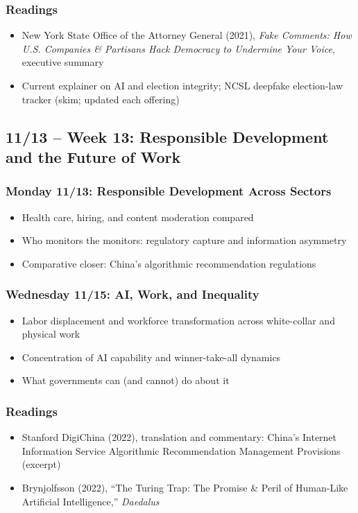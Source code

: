 \documentclass[12pt]{article}
\begin{document}
    \subsubsection*{Readings}
        \begin{itemize}
            \item New York State Office of the Attorney General (2021), \emph{Fake Comments: How U.S. Companies \& Partisans Hack Democracy to Undermine Your Voice}, executive summary
            \item Current explainer on AI and election integrity; NCSL deepfake election-law tracker (skim; updated each offering)
        \end{itemize}

\subsection*{11/13 -- Week 13: Responsible Development and the Future of Work}
    \subsubsection*{Monday 11/13: Responsible Development Across Sectors}
        \begin{itemize}
            \item Health care, hiring, and content moderation compared
            \item Who monitors the monitors: regulatory capture and information asymmetry
            \item Comparative closer: China's algorithmic recommendation regulations
        \end{itemize}
    \subsubsection*{Wednesday 11/15: AI, Work, and Inequality}
        \begin{itemize}
            \item Labor displacement and workforce transformation across white-collar and physical work
            \item Concentration of AI capability and winner-take-all dynamics
            \item What governments can (and cannot) do about it
        \end{itemize}
    \subsubsection*{Readings}
        \begin{itemize}
            \item Stanford DigiChina (2022), translation and commentary: China's Internet Information Service Algorithmic Recommendation Management Provisions (excerpt)
            \item Brynjolfsson (2022), ``The Turing Trap: The Promise \& Peril of Human-Like Artificial Intelligence,'' \emph{Daedalus}
        \end{itemize}
\end{document}
